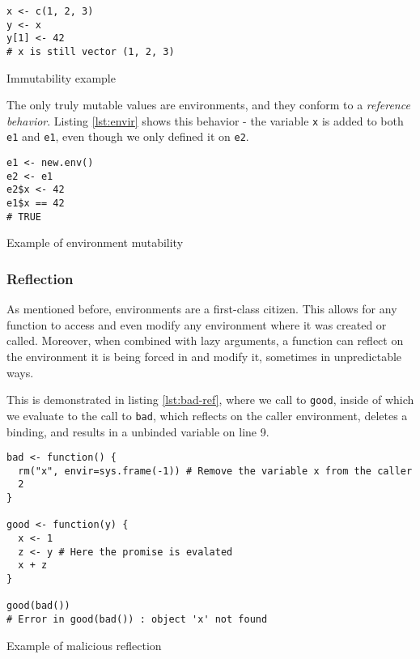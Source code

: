 \begin{listing}
	\centering
	\begin{verbatim}
x <- c(1, 2, 3)
y <- x
y[1] <- 42
# x is still vector (1, 2, 3)
  \end{verbatim}
	\caption{Immutability example}\label{lst:imm}
\end{listing}

The only truly mutable values are environments, and they conform to a \textit{reference behavior}. Listing \ref{lst:envir} shows this behavior - the variable \texttt{x} is added to both \texttt{e1} and \texttt{e1}, even though we only defined it on \texttt{e2}.

\begin{listing}
	\centering
	\begin{verbatim}
e1 <- new.env()
e2 <- e1
e2$x <- 42
e1$x == 42
# TRUE
  \end{verbatim}
	\caption{Example of environment mutability}\label{lst:envir}
\end{listing}

\subsubsection*{Reflection}

As mentioned before, environments are a first-class citizen. This allows for any function to access and even modify any environment where it was created or called. Moreover, when combined with lazy arguments, a function can reflect on the environment it is being forced in and modify it, sometimes in unpredictable ways.

This is demonstrated in listing \ref{lst:bad-ref}, where we call to \texttt{good}, inside of which we evaluate to the call to \texttt{bad}, which reflects on the caller environment, deletes a binding, and results in a unbinded variable on line 9.

\begin{listing}
	\centering
	\begin{verbatim}
bad <- function() {
  rm("x", envir=sys.frame(-1)) # Remove the variable x from the caller
  2
}

good <- function(y) {
  x <- 1
  z <- y # Here the promise is evalated
  x + z
}

good(bad())
# Error in good(bad()) : object 'x' not found
  \end{verbatim}
	\caption{Example of malicious reflection\todocite}\label{lst:bad-ref}
\end{listing}

